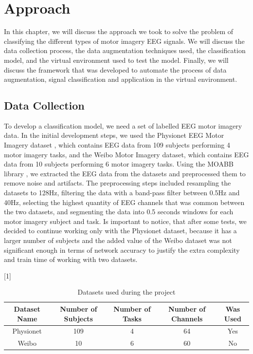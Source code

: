 \chapter{Approach}\label{ch:approach}
In this chapter, we will discuss the approach we took to solve the problem of classifying the different types of motor imagery EEG signals.
We will discuss the data collection process, the data augmentation techniques used, the classification model, and the virtual environment used to test the model. 
Finally, we will discuss the framework that was developed to automate the process of data augmentation, signal classification and application in the virtual environment.

\section{Data Collection}
To develop a classification model, we need a set of labelled EEG motor imagery data.
In the initial development steps, we used the Physionet EEG Motor Imagery dataset \cite{goldberger2000physiobank}, which contains EEG data from 109 subjects performing 4 motor imagery tasks, and the Weibo Motor Imagery \cite{yi2014evaluation} dataset, which contains EEG data from 10 subjects performing 6 motor imagery tasks.
Using the MOABB library \cite{Aristimunha_Mother_of_all_2023, chevallier2024largest, jayaram2018moabb}, we extracted the EEG data from the datasets and preprocessed them to remove noise and artifacts.
The preprocessing steps included resampling the datasets to 128Hz, filtering the data with a band-pass filter between 0.5Hz and 40Hz, selecting the highest quantity of EEG channels that was common between the two datasets, and segmenting the data into 0.5 seconds windows for each motor imagery subject and task.
Is important to notice, that after some tests, we decided to continue working only with the Physionet dataset, because it has a larger number of subjects and the added value of the Weibo dataset was not significant enough in terms of network accuracy to justify the extra complexity and train time of working with two datasets.
\begin{table}[!htbp]
    \centering
    \scalebox{.8}[1]{
    \begin{tabular}{|c|c|c|c||c|}
        \hline
        \textbf{Dataset Name} & \textbf{Number of Subjects} & \textbf{Number of Tasks} & \textbf{Number of Channels} & \textbf{Was Used}\\
        \hline
        \hline
        Physionet & 109 & 4 & 64 & Yes\\
        \hline
        Weibo & 10 & 6 & 60 & No\\
        \hline
    \end{tabular}
    }
    \caption{Datasets used during the project}
    \label{tab:datasamples}
\end{table}

